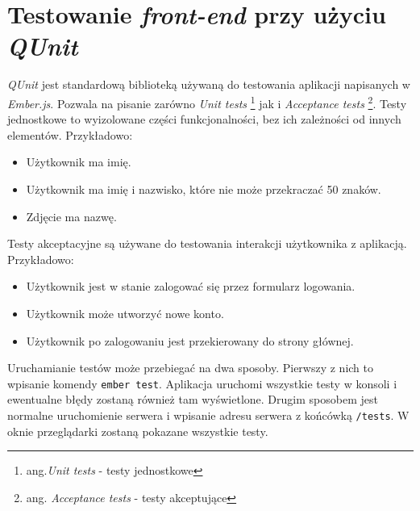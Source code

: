 \documentclass[openright]{xmgr}
\begin{document}
\section{Testowanie \textit{front-end} przy użyciu \textit{QUnit}}
\textit{QUnit} jest standardową biblioteką używaną do testowania aplikacji napisanych w \textit{Ember.js}. Pozwala na pisanie zarówno \textit{Unit tests} \footnote{ang.\textit{Unit tests} - testy jednostkowe} jak i \textit{Acceptance tests} \footnote{ang. \textit{Acceptance tests} - testy akceptujące}.  Testy jednostkowe to wyizolowane części funkcjonalności, bez ich zależności od innych elementów. Przykładowo:
\begin{itemize}
\item Użytkownik ma imię.
\item Użytkownik ma imię i nazwisko, które nie może przekraczać 50 znaków.
\item Zdjęcie ma nazwę.
\end{itemize}
Testy akceptacyjne są używane do testowania interakcji użytkownika z aplikacją. Przykładowo:
\begin{itemize}
\item Użytkownik jest w stanie zalogować się przez formularz logowania.
\item Użytkownik może utworzyć nowe konto.
\item Użytkownik po zalogowaniu jest przekierowany do strony głównej.
\end{itemize}
Uruchamianie testów może przebiegać na dwa sposoby. Pierwszy z nich to wpisanie komendy \verb|ember test|. Aplikacja uruchomi wszystkie testy w konsoli i ewentualne błędy zostaną również tam wyświetlone. Drugim sposobem jest normalne uruchomienie serwera i wpisanie adresu serwera z końcówką \verb|/tests|. W oknie przeglądarki zostaną pokazane wszystkie testy.
\end{document}
